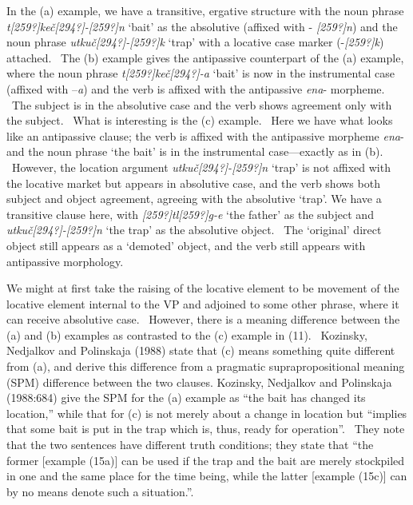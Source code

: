 \documentclass[12pt]{article}
\newenvironment{styleStandard}{\setlength\leftskip{0cm}\setlength\rightskip{0cm plus 1fil}\setlength\parindent{0cm}\setlength\parfillskip{0pt plus 1fil}\setlength\parskip{0in plus 1pt}\writerlistparindent\writerlistleftskip\leavevmode\normalfont\normalsize\writerlistlabel\ignorespaces}{\unskip\vspace{0.111in plus 0.0111in}\par}
\newcommand\writerlistleftskip{}
\newcommand\writerlistparindent{}
\newcommand\writerlistlabel{}
\begin{document}
\begin{styleStandard}
In the (a) example, we have a transitive, ergative structure with the noun phrase \textit{t[259?]keč[294?]-[259?]n} ‘bait’ as the absolutive (affixed with - \textit{[259?]n}) and the noun phrase \textit{utkuč[294?]-[259?]k} ‘trap’ with a locative case marker (-\textit{[259?]k}) attached. \ The (b) example gives the antipassive counterpart of the (a) example, where the noun phrase \textit{t[259?]keč[294?]-a} ‘bait’ is now in the instrumental case (affixed with –\textit{a}) and the verb is affixed with the antipassive \textit{ena}{}- morpheme. \ The subject is in the absolutive case and the verb shows agreement only with the subject. \ What is interesting is the (c) example. \ Here we have what looks like an antipassive clause; the verb is affixed with the antipassive morpheme \textit{ena}{}- and the noun phrase ‘the bait’ is in the instrumental case—exactly as in (b). \ However, the location argument \textit{utkuč[294?]-[259?]n} ‘trap’ is not affixed with the locative market but appears in absolutive case, and the verb shows both subject and object agreement, agreeing with the absolutive ‘trap’. We have a transitive clause here, with \textit{[259?]tl[259?]g-e} ‘the father’ as the subject and \textit{utkuč[294?]-[259?]n} ‘the trap’ as the absolutive object. \ The ‘original’ direct object still appears as a ‘demoted’ object, and the verb still appears with antipassive morphology. 
\end{styleStandard}

\begin{styleStandard}
We might at first take the raising of the locative element to be movement of the locative element internal to the VP and adjoined to some other phrase, where it can receive absolutive case. \ However, there is a meaning difference between the (a) and (b) examples as contrasted to the (c) example in (11). \ Kozinsky, Nedjalkov and Polinskaja (1988) state that (c) means something quite different from (a), and derive this difference from a pragmatic suprapropositional meaning (SPM) difference between the two clauses. Kozinsky, Nedjalkov and Polinskaja (1988:684) give the SPM for the (a) example as “the bait has changed its location,” while that for (c) is not merely about a change in location but “implies that some bait is put in the trap which is, thus, ready for operation”. \ They note that the two sentences have different truth conditions; they state that “the former [example (15a)] can be used if the trap and the bait are merely stockpiled in one and the same place for the time being, while the latter [example (15c)] can by no means denote such a situation.”. \ 
\end{styleStandard}
\end{document}
